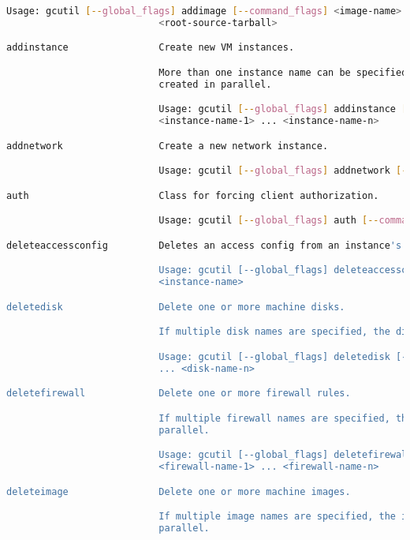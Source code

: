 \begin{lstlisting}[language=Bash]
                           Usage: gcutil [--global_flags] addimage [--command_flags] <image-name>
                           <root-source-tarball>

addinstance                Create new VM instances.

                           More than one instance name can be specified. Multiple instances will be
                           created in parallel.

                           Usage: gcutil [--global_flags] addinstance [--command_flags]
                           <instance-name-1> ... <instance-name-n>

addnetwork                 Create a new network instance.

                           Usage: gcutil [--global_flags] addnetwork [--command_flags] <network-name>

auth                       Class for forcing client authorization.

                           Usage: gcutil [--global_flags] auth [--command_flags]

deleteaccessconfig         Deletes an access config from an instance's network interface.

                           Usage: gcutil [--global_flags] deleteaccessconfig [--command_flags]
                           <instance-name>

deletedisk                 Delete one or more machine disks.

                           If multiple disk names are specified, the disks will be deleted in parallel.

                           Usage: gcutil [--global_flags] deletedisk [--command_flags] <disk-name-1>
                           ... <disk-name-n>

deletefirewall             Delete one or more firewall rules.

                           If multiple firewall names are specified, the firewalls will be deleted in
                           parallel.

                           Usage: gcutil [--global_flags] deletefirewall [--command_flags]
                           <firewall-name-1> ... <firewall-name-n>

deleteimage                Delete one or more machine images.

                           If multiple image names are specified, the images will be deleted in
                           parallel.


\end{lstlisting}
